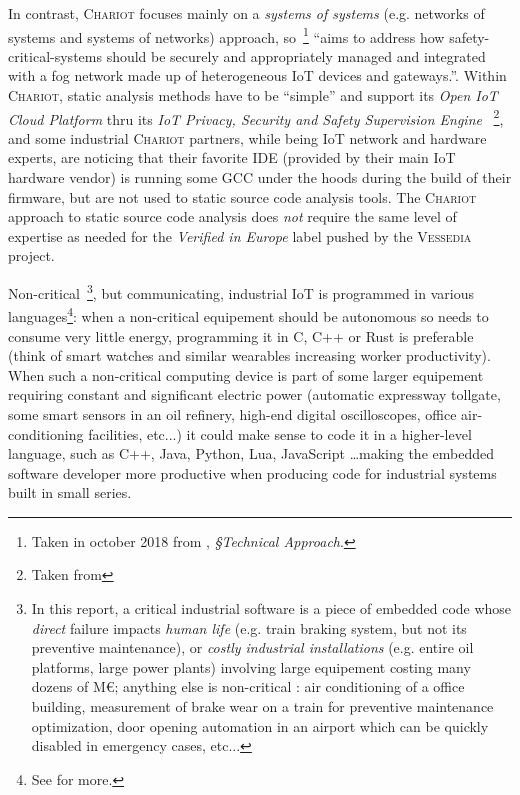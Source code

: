In contrast, \textsc{Chariot} focuses mainly on a \emph{systems of
  systems} (e.g. networks of systems and systems of networks)
approach, so~\footnote{Taken in october 2018 from , \emph{\S Technical Approach}.}
``aims to address how safety-critical-systems should
be securely and appropriately managed and integrated with a fog
network made up of heterogeneous IoT devices and gateways.''. Within
\textsc{Chariot}, static analysis methods have to be ``simple'' and
support its \emph{Open IoT Cloud Platform} thru its \emph{IoT Privacy,
  Security and Safety Supervision Engine} ~\footnote{Taken
  from }, and some
industrial \textsc{Chariot} partners, while being IoT network and
hardware experts, are noticing that their favorite IDE (provided by
their main IoT hardware vendor) is running some GCC under the hoods
during the build of their firmware, but are not used to static source
code analysis tools. The \textsc{Chariot} approach to static source
code analysis does \emph{not} require the same level of expertise as needed for
the \emph{Verified in Europe} label pushed by the \textsc{Vessedia}
project.

Non-critical~\footnote{In this report, a critical industrial software
  is a piece of embedded code whose \emph{direct} failure impacts
  \emph{human life} (e.g. train braking system, but not its preventive
  maintenance), or \emph{costly industrial installations}
   (e.g. entire oil platforms, large power
  plants) involving large equipement costing many dozens of M€;
  anything else is non-critical : air
  conditioning of a office building, measurement of brake wear on a
  train for preventive maintenance optimization, door opening
  automation in an airport which can be quickly disabled in emergency
  cases, etc...}, but communicating, industrial IoT is programmed in
various languages\footnote{See
  for more.}: when a non-critical equipement should be autonomous so
needs to consume very little energy, programming it in C, C++ or Rust
is preferable (think of smart watches and similar wearables increasing
worker productivity). When such a non-critical computing device is
part of some larger equipement requiring constant and significant
electric power (automatic expressway tollgate, some smart sensors in
an oil refinery, high-end digital oscilloscopes, office
air-conditioning facilities, etc...) it could make sense to code it
in a higher-level language, such as C++, Java, Python, Lua, JavaScript \ldots making
the embedded software developer more productive when producing code
for industrial systems built in small series.


